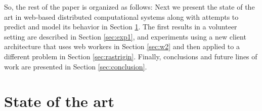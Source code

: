 \documentclass{sig-alternate}
\begin{document}
So, the rest of the paper is organized as follows: Next we present the
state of the art in web-based distributed
computational systems along with attempts to predict and model its
behavior  in Section \ref{sec:soa}. The first results in a volunteer
setting are described 
in Section \ref{sec:exp1}, and experiments using a new client
architecture that uses web workers in Section \ref{sec:w2} and then
applied to a different problem in Section \ref{sec:rastrigin}. 
Finally, conclusions and future lines of work are presented in Section
\ref{sec:conclusion}. 

\section{State of the art}
\label{sec:soa}
\end{document}
